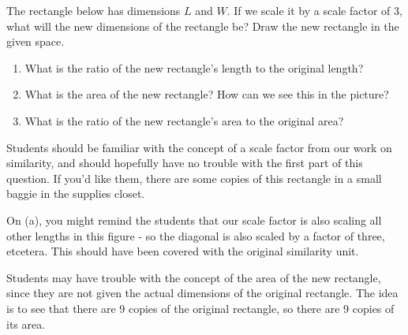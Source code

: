\documentclass[nooutcomes]{ximera}
\begin{document}
\begin{problem}
The rectangle below has dimensions $L$ and $W$. If we scale it by a scale factor of 3, what will the new dimensions of the rectangle be? Draw the new rectangle in the given space.\\

 \hspace{4cm}
\vskip 2.5in

\begin{enumerate}
    \item What is the ratio of the new rectangle's length to the original  length?
    \item What is the area of the new rectangle?  How can we see this in the picture?
    \item What is the ratio of the new rectangle's area to the original area?
\end{enumerate}

\begin{instructorNotes}
Students should be familiar with the concept of a scale factor from our work on similarity, and should hopefully have no trouble with the first part of this question.  If you'd like them, there are some copies of this rectangle in a small baggie in the supplies closet.

On (a), you might remind the students that our scale factor is also scaling all other lengths in this figure - so the diagonal is also scaled by a factor of three, etcetera.  This should have been covered with the original similarity unit.

Students may have trouble with the concept of the area of the new rectangle, since they are not given the actual dimensions of the original rectangle.  The idea is to see that there are 9 copies of the original rectangle, so there are 9 copies of its area.
\end{instructorNotes}
\end{problem}
\end{document}
